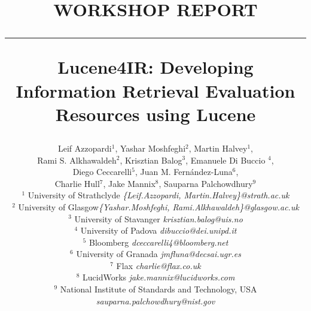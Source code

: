 \documentclass[12pt]{article}
\begin{document}
\title{\vspace{-2.5cm}
\begin{center}
\textbf{\small{WORKSHOP REPORT}}\\\vspace{-0.5cm} \rule{17.5cm}{1pt}
\end{center}
\vspace{1cm}\textbf{Lucene4IR: Developing Information Retrieval Evaluation Resources using Lucene }}

\newcommand{\todo}[1]{\textcolor{red}{#1}}
\author{
Leif Azzopardi$^{1}$, Yashar Moshfeghi$^{2}$, Martin Halvey$^{1}$, \\
 Rami S. Alkhawaldeh$^{2}$, Krisztian Balog$^{3}$, Emanuele Di Buccio $^{4}$, \\
Diego Ceccarelli$^{5}$, Juan M. Fern\'andez-Luna$^{6}$,\\
 Charlie Hull$^{7}$, Jake Mannix$^{8}$, Sauparna Palchowdhury$^{9}$\\ 
    $^{1}$ {\small University of Strathclyde  \emph{ \{Leif.Azzopardi, Martin.Halvey\}@strath.ac.uk}}\\
    $^{2}$ {\small University of Glasgow\emph{\small {\{Yashar.Moshfeghi, Rami.Alkhawaldeh\}@glasgow.ac.uk}}}\\
	$^{3}$ {\small University of Stavanger \emph{\small krisztian.balog@uis.no}}\\
	$^{4}$ {\small University of Padova \emph{\small dibuccio@dei.unipd.it}}\\
	$^{5}$ {\small Bloomberg \emph{\small dceccarelli4@bloomberg.net}}\\	
	$^{6}$ {\small University of Granada \emph{\small jmfluna@decsai.ugr.es}}\\
	$^{7}$ {\small Flax \emph{\small charlie@flax.co.uk}}\\
	$^{8}$ {\small LucidWorks \emph{\small jake.mannix@lucidworks.com}}\\
	$^{9}$ {\small National Institute of Standards and Technology, USA \emph{\small sauparna.palchowdhury@nist.gov}}
}
\end{document}
